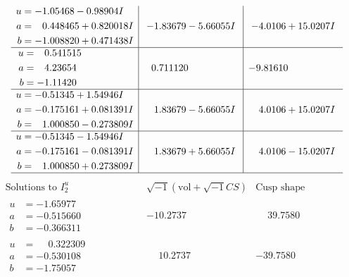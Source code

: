\documentclass[1p]{elsarticle_modified}
\theoremstyle{definition}
\newcommand{\I}{\sqrt{-1}}
\begin{document}
$$\begin{array}{c|c|c}
\begin{aligned}
u &= -1.05468 - 0.98904 I \\
a &= \phantom{-}0.448465 + 0.820018 I \\
b &= -1.008820 + 0.471438 I\end{aligned}
 & -1.83679 - 5.66055 I & -4.0106 + 15.0207 I \\ \hline\begin{aligned}
u &= \phantom{-}0.541515\phantom{ +0.000000I} \\
a &= \phantom{-}4.23654\phantom{ +0.000000I} \\
b &= -1.11420\phantom{ +0.000000I}\end{aligned}
 & \phantom{-}0.711120\phantom{ +0.000000I} & -9.81610\phantom{ +0.000000I} \\ \hline\begin{aligned}
u &= -0.51345 + 1.54946 I \\
a &= -0.175161 + 0.081391 I \\
b &= \phantom{-}1.000850 - 0.273809 I\end{aligned}
 & \phantom{-}1.83679 - 5.66055 I & \phantom{-}4.0106 + 15.0207 I \\ \hline\begin{aligned}
u &= -0.51345 - 1.54946 I \\
a &= -0.175161 - 0.081391 I \\
b &= \phantom{-}1.000850 + 0.273809 I\end{aligned}
 & \phantom{-}1.83679 + 5.66055 I & \phantom{-}4.0106 - 15.0207 I\\
 \hline 
 \end{array}$$\newpage$$\begin{array}{c|c|c}  
\text{Solutions to }I^u_{2}& \I (\text{vol} + \sqrt{-1}CS) & \text{Cusp shape}\\
 \hline 
\begin{aligned}
u &= -1.65977\phantom{ +0.000000I} \\
a &= -0.515660\phantom{ +0.000000I} \\
b &= -0.366311\phantom{ +0.000000I}\end{aligned}
 & -10.2737\phantom{ +0.000000I} & \phantom{-}39.7580\phantom{ +0.000000I} \\ \hline\begin{aligned}
u &= \phantom{-}0.322309\phantom{ +0.000000I} \\
a &= -0.530108\phantom{ +0.000000I} \\
b &= -1.75057\phantom{ +0.000000I}\end{aligned}
 & \phantom{-}10.2737\phantom{ +0.000000I} & -39.7580\phantom{ +0.000000I} \\ \hline\begin{aligned}

\end{aligned}
\end{array}$$
\end{document}
